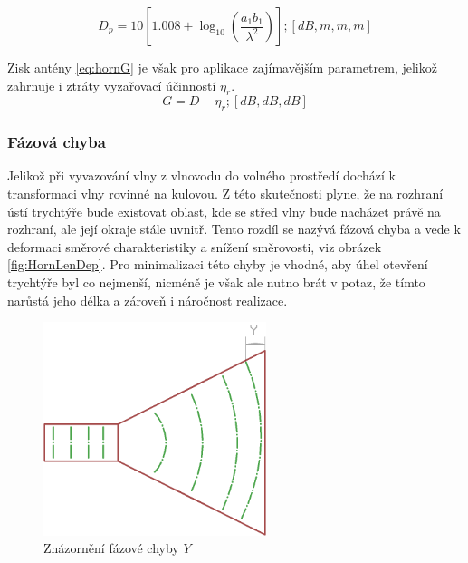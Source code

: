 \begin{equation}
D_p = 10 [1.008+\log_{10}({\frac{a_1  b_1}{\lambda^2}})] ; [dB, m, m, m]
\label{eq:hornD}
\end{equation}

\renewcommand{\figurename}{Obrázek}
Zisk antény \ref{eq:hornG} je však pro aplikace zajímavějším parametrem, jelikož zahrnuje i ztráty vyzařovací účinností $\eta_r$.
\begin{equation}
G = D - \eta_{r} ; [dB, dB , dB]
\label{eq:hornG}
\end{equation}

\subsubsection{Fázová chyba}
Jelikož při vyvazování vlny z vlnovodu do volného prostředí dochází k transformaci vlny rovinné na kulovou. Z této skutečnosti plyne, že na rozhraní ústí trychtýře bude existovat oblast, kde se střed vlny bude nacházet právě na rozhraní, ale její okraje stále uvnitř. Tento rozdíl se nazývá fázová chyba a vede k deformaci směrové charakteristiky a snížení směrovosti, viz obrázek \ref{fig:HornLenDep}. Pro minimalizaci této chyby je vhodné, aby úhel otevření trychtýře byl co nejmenší, nicméně je však ale nutno brát v potaz, že tímto narůstá jeho délka a zároveň i náročnost realizace.
\begin{figure}[!htbp]
\begin{center}
\includegraphics[width=6.5cm]{pics/hornErr}
\caption{Znázornění fázové chyby $Y$}
\label{fig:HornErr}
\end{center}
\end{figure}

